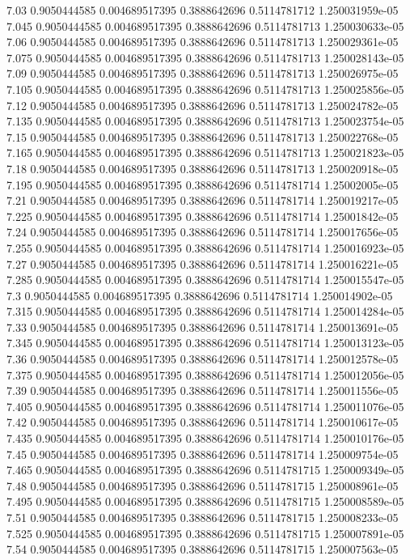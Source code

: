{7.03 0.9050444585 0.004689517395 0.3888642696 0.5114781712 1.250031959e-05
7.045 0.9050444585 0.004689517395 0.3888642696 0.5114781713 1.250030633e-05
7.06 0.9050444585 0.004689517395 0.3888642696 0.5114781713 1.250029361e-05
7.075 0.9050444585 0.004689517395 0.3888642696 0.5114781713 1.250028143e-05
7.09 0.9050444585 0.004689517395 0.3888642696 0.5114781713 1.250026975e-05
7.105 0.9050444585 0.004689517395 0.3888642696 0.5114781713 1.250025856e-05
7.12 0.9050444585 0.004689517395 0.3888642696 0.5114781713 1.250024782e-05
7.135 0.9050444585 0.004689517395 0.3888642696 0.5114781713 1.250023754e-05
7.15 0.9050444585 0.004689517395 0.3888642696 0.5114781713 1.250022768e-05
7.165 0.9050444585 0.004689517395 0.3888642696 0.5114781713 1.250021823e-05
7.18 0.9050444585 0.004689517395 0.3888642696 0.5114781713 1.250020918e-05
7.195 0.9050444585 0.004689517395 0.3888642696 0.5114781714 1.25002005e-05
7.21 0.9050444585 0.004689517395 0.3888642696 0.5114781714 1.250019217e-05
7.225 0.9050444585 0.004689517395 0.3888642696 0.5114781714 1.25001842e-05
7.24 0.9050444585 0.004689517395 0.3888642696 0.5114781714 1.250017656e-05
7.255 0.9050444585 0.004689517395 0.3888642696 0.5114781714 1.250016923e-05
7.27 0.9050444585 0.004689517395 0.3888642696 0.5114781714 1.250016221e-05
7.285 0.9050444585 0.004689517395 0.3888642696 0.5114781714 1.250015547e-05
7.3 0.9050444585 0.004689517395 0.3888642696 0.5114781714 1.250014902e-05
7.315 0.9050444585 0.004689517395 0.3888642696 0.5114781714 1.250014284e-05
7.33 0.9050444585 0.004689517395 0.3888642696 0.5114781714 1.250013691e-05
7.345 0.9050444585 0.004689517395 0.3888642696 0.5114781714 1.250013123e-05
7.36 0.9050444585 0.004689517395 0.3888642696 0.5114781714 1.250012578e-05
7.375 0.9050444585 0.004689517395 0.3888642696 0.5114781714 1.250012056e-05
7.39 0.9050444585 0.004689517395 0.3888642696 0.5114781714 1.250011556e-05
7.405 0.9050444585 0.004689517395 0.3888642696 0.5114781714 1.250011076e-05
7.42 0.9050444585 0.004689517395 0.3888642696 0.5114781714 1.250010617e-05
7.435 0.9050444585 0.004689517395 0.3888642696 0.5114781714 1.250010176e-05
7.45 0.9050444585 0.004689517395 0.3888642696 0.5114781714 1.250009754e-05
7.465 0.9050444585 0.004689517395 0.3888642696 0.5114781715 1.250009349e-05
7.48 0.9050444585 0.004689517395 0.3888642696 0.5114781715 1.250008961e-05
7.495 0.9050444585 0.004689517395 0.3888642696 0.5114781715 1.250008589e-05
7.51 0.9050444585 0.004689517395 0.3888642696 0.5114781715 1.250008233e-05
7.525 0.9050444585 0.004689517395 0.3888642696 0.5114781715 1.250007891e-05
7.54 0.9050444585 0.004689517395 0.3888642696 0.5114781715 1.250007563e-05
}
